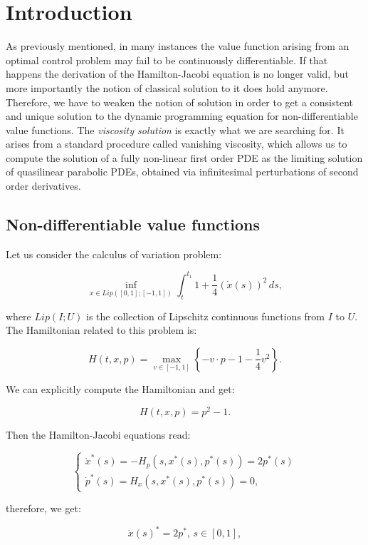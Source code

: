 \section{Introduction}

As previously mentioned, in many instances the value function arising from an optimal control problem may fail to be continuously 
differentiable. If that happens the derivation of the Hamilton-Jacobi equation is no longer valid, but more importantly 
the notion of classical solution to it does hold anymore. Therefore, we have to weaken the notion of solution in order to get 
a consistent and unique solution to the dynamic programming equation for non-differentiable value functions. The \textit{viscosity solution} 
is exactly what we are searching for. It arises from a standard procedure called vanishing viscosity, which allows us to compute the 
solution of a fully non-linear first order PDE as the limiting solution of quasilinear parabolic PDEs, obtained via infinitesimal 
perturbations of second order derivatives. 

\subsection{Non-differentiable value functions}

Let us consider the calculus of variation problem:

\begin{equation}
    \inf_{x\in Lip([0,1];[-1,1])} \int_t^{t_1} 1 + \frac{1}{4}(\dot{x}(s))^2 \,ds,
\end{equation}

where $Lip(I;U)$ is the collection of Lipschitz continuous functions from $I$ to $U$. The Hamiltonian related to 
this problem is:

\[H(t,x,p) = \max_{v\in [-1,1]} \left\{-v\cdot p - 1 - \frac{1}{4}v^2\right\}.\]

We can explicitly compute the Hamiltonian and get:

\[H(t,x,p)=p^2-1.\]

Then the Hamilton-Jacobi equations read:

\[\begin{cases}
    \dot{x}^{\ast}(s) = -H_p(s,x^{\ast}(s),p^{\ast}(s)) =  2p^{\ast}(s)\\
    \dot{p}^{\ast}(s) = H_x(s,x^{\ast}(s),p^{\ast}(s)) = 0,
\end{cases}\]

therefore, we get:

\[\dot{x}(s)^{\ast} = 2p^{\ast},\,s\in[0,1],\]

